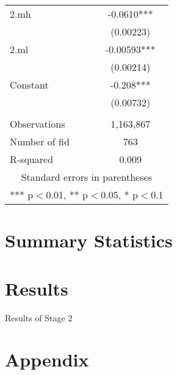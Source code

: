 \documentclass{beamer}
\begin{document}
\begin{frame}
\begin{tabular}{lc}
        2.mh          & -0.0610***                                \\
                      & (0.00223)                                 \\
        2.ml          & -0.00593***                               \\
                      & (0.00214)                                 \\
        Constant      & -0.208***                                 \\
                      & (0.00732)                                 \\
                      &                                           \\
        Observations  & 1,163,867                                 \\
        Number of fid & 763                                       \\
        R-squared     & 0.009                                     \\ \hline
        \multicolumn{2}{c}{ Standard errors in parentheses}       \\
        \multicolumn{2}{c}{ *** p$<$0.01, ** p$<$0.05, * p$<$0.1} \\
    \end{tabular}


\end{frame}


\section{Summary Statistics}



\section{Results}



\begin{frame}{Results of Stage 2}



\end{frame}








\section{Appendix}



























\end{document}
